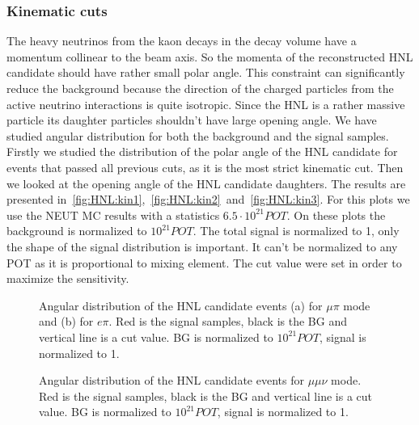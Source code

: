\documentclass[../main.tex]{subfiles}
\begin{document}
\subsubsection{Kinematic cuts}
The heavy neutrinos from the kaon decays in the decay volume have a momentum collinear to the beam axis. So the momenta of the reconstructed HNL candidate should have rather small polar angle. This constraint can significantly reduce the background because the direction of the charged particles from the active neutrino interactions is quite isotropic. Since the HNL is a rather massive particle its daughter particles shouldn't have large opening angle. We have studied angular distribution for both the background and the signal samples. Firstly we studied the distribution of the polar angle of the HNL candidate for events that passed all previous cuts, as it is the most strict kinematic cut. Then we looked at the opening angle of the HNL candidate daughters. The results are presented in~\autoref{fig:HNL:kin1},~\autoref{fig:HNL:kin2}~and~\autoref{fig:HNL:kin3}. For this plots we use the NEUT MC results with a statistics $6.5\cdot 10^{21} POT$. On these plots the background is normalized to $10^{21}POT$. The total signal is normalized to 1, only the shape of the signal distribution is important. It can't be normalized to any POT as it is proportional to mixing element. The cut value were set in order to maximize the sensitivity.

\begin{figure}[!ht]
  \begin{minipage}[h]{0.49\linewidth}
  \end{minipage}
  \hfill
  \begin{minipage}[h]{0.49\linewidth}
  \end{minipage}
  \caption{Angular distribution of the HNL candidate events (a) for $\mu\pi$ mode and (b) for $e\pi$. Red is the signal samples, black is the BG and vertical line is a cut value. BG is normalized to $10^{21}POT$, signal is normalized to 1.}
  \label{fig:HNL:kin1}
\end{figure}

\begin{figure}[!ht]
  \caption{Angular distribution of the HNL candidate events for $\mu\mu\nu$ mode. Red is the signal samples, black is the BG and vertical line is a cut value. BG is normalized to $10^{21}POT$, signal is normalized to 1.}
  \label{fig:HNL:kin2}
\end{figure}
\end{document}
